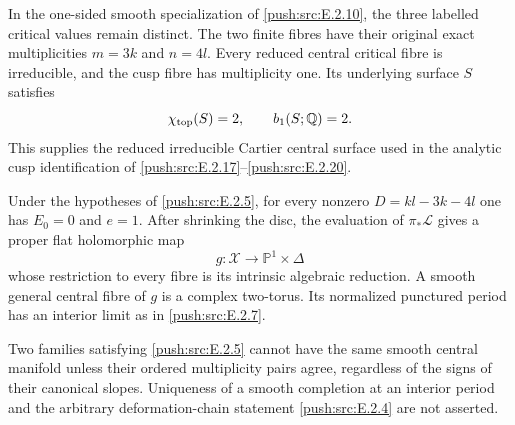 
\begin{proposition}\hypertarget{tag-0331}{}\label{push:src:E.2.16}


In the one-sided smooth specialization of \ref{push:src:E.2.10},
the three labelled critical values remain distinct.
The two finite fibres have their original exact
multiplicities $m=3k$ and $n=4l$.  Every reduced
central critical fibre is irreducible, and the
cusp fibre has multiplicity one.  Its underlying
surface $S$ satisfies
\[
 \chi_{\rm top}(S)=2,\qquad b_1(S;\mathbb Q)=2.
\]
This supplies the reduced irreducible Cartier central
surface used in the analytic cusp identification of
\ref{push:src:E.2.17}--\ref{push:src:E.2.20}.
\end{proposition}

\begin{proposition}\hypertarget{tag-032V}{}\label{push:src:E.2.10}


Under the hypotheses of \ref{push:src:E.2.5}, for every nonzero
$D=kl-3k-4l$ one has $E_0=0$ and $e=1$.
After shrinking the disc, the evaluation of
$\pi_*\mathcal L$ gives a proper flat holomorphic map
\[
 g:\mathcal X\longrightarrow\mathbb P^1\times\Delta
\]
whose restriction to every fibre is its intrinsic algebraic
reduction.  A smooth general central fibre of $g$ is a
complex two-torus.  Its normalized punctured period has
an interior limit as in \ref{push:src:E.2.7}.

Two families satisfying \ref{push:src:E.2.5} cannot have the same smooth
central manifold unless their ordered multiplicity pairs
agree, regardless of the signs of their canonical slopes.
Uniqueness of a smooth completion at an interior period and
the arbitrary deformation-chain statement \ref{push:src:E.2.4} are not
asserted.
\end{proposition}

